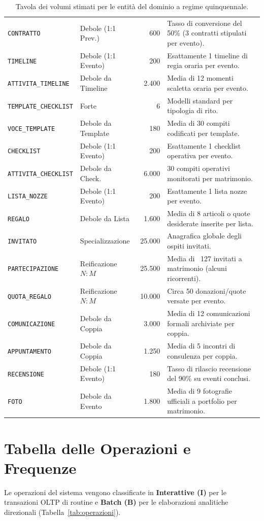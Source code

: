 \begin{table}[h!]
\begin{tabularx}{\textwidth}{l p{2.5cm} r X}
\texttt{CONTRATTO} & Debole (1:1 Prev.) & 600 & Tasso di conversione del 50\% (3 contratti stipulati per evento). \\
\texttt{TIMELINE} & Debole (1:1 Evento)& 200 & Esattamente 1 timeline di regia oraria per evento. \\
\texttt{ATTIVITA\_TIMELINE} & Debole da Timeline & 2.400 & Media di 12 momenti scaletta oraria per evento. \\
\texttt{TEMPLATE\_CHECKLIST}& Forte & 6 & Modelli standard per tipologia di rito. \\
\texttt{VOCE\_TEMPLATE} & Debole da Template & 180 & Media di 30 compiti codificati per template. \\
\texttt{CHECKLIST} & Debole (1:1 Evento)& 200 & Esattamente 1 checklist operativa per evento. \\
\texttt{ATTIVITA\_CHECKLIST}& Debole da Check. & 6.000 & 30 compiti operativi monitorati per matrimonio. \\
\texttt{LISTA\_NOZZE} & Debole (1:1 Evento)& 200 & Esattamente 1 lista nozze per evento. \\
\texttt{REGALO} & Debole da Lista & 1.600 & Media di 8 articoli o quote desiderate inserite per lista. \\
\texttt{INVITATO} & Specializzazione & 25.000 & Anagrafica globale degli ospiti invitati. \\
\texttt{PARTECIPAZIONE} & Reificazione $N:M$ & 25.500 & Media di ~127 invitati a matrimonio (alcuni ricorrenti). \\
\texttt{QUOTA\_REGALO} & Reificazione $N:M$ & 10.000 & Circa 50 donazioni/quote versate per evento. \\
\texttt{COMUNICAZIONE} & Debole da Coppia & 3.000 & Media di 12 comunicazioni formali archiviate per coppia. \\
\texttt{APPUNTAMENTO} & Debole da Coppia & 1.250 & Media di 5 incontri di consulenza per coppia. \\
\texttt{RECENSIONE} & Debole (1:1 Evento)& 180 & Tasso di rilascio recensione del 90\% su eventi conclusi. \\
\texttt{FOTO} & Debole da Evento & 1.800 & Media di 9 fotografie ufficiali a portfolio per matrimonio. \\
\bottomrule
\end{tabularx}
\caption{Tavola dei volumi stimati per le entità del dominio a regime quinquennale.}
\label{tab:volumi}
\end{table}

\section{Tabella delle Operazioni e Frequenze}
Le operazioni del sistema vengono classificate in \textbf{Interattive (I)} per le transazioni OLTP di routine e \textbf{Batch (B)} per le elaborazioni analitiche direzionali (Tabella~\ref{tab:operazioni}).

